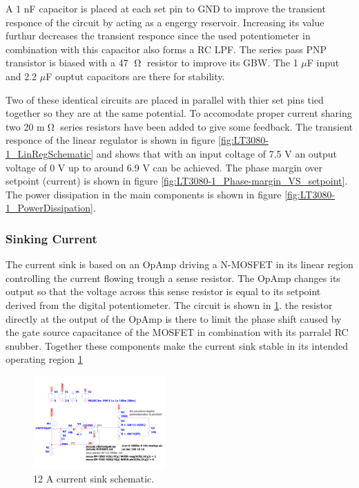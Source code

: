 A 1 nF capacitor is placed at each set pin to GND to improve the transient responce of the circuit by acting as a engergy reservoir. Increasing its value furthur decreases the transient responce since the used potentiometer in combination with this capacitor also forms a RC LPF. The series pass PNP transistor is biased with a 47 $\tcohm$ resistor to improve its GBW. The 1 $\mu$F input and 2.2 $\mu$F ouptut capacitors are there for stability.

Two of these identical circuits are placed in parallel with thier set pins tied together so they are at the same potential. To accomodate proper current sharing two 20 m$\tcohm$ series resistors have been added to give some feedback.
The transient responce of the linear regulator is shown in figure \ref{fig:LT3080-1_LinRegSchematic} and shows that with an input coltage of 7.5 V an output voltage of 0 V up to around 6.9 V can be achieved. The phase margin over setpoint (current) is shown in figure \ref{fig:LT3080-1_Phase-margin_VS_setpoint}. The power dissipation in the main components is shown in figure \ref{fig:LT3080-1_PowerDissipation}.

\subsubsection{Sinking Current}
The current sink is based on an OpAmp driving a N-MOSFET in its linear region controlling the current flowing trough a sense resistor. The OpAmp changes its output so that the voltage across this sense resistor is equal to its setpoint derived from the digital potentiometer. The circuit is shown in \ref{fig:CurrentSinkSchematic}. the resistor directly at the output of the OpAmp is there to limit the phase shift caused by the gate source capacitance of the MOSFET in combination with its parralel RC snubber. Together these components make the current sink stable in its intended operating region \ref{fig:CurrentSinkSchematic}

\begin{figure}[h!]
    \centering
    \includegraphics[width=0.45\textwidth]{CurrentSinkSchematic.pdf}
    \caption{12 A current sink schematic.}
    \label{fig:CurrentSinkSchematic}
\end{figure}

